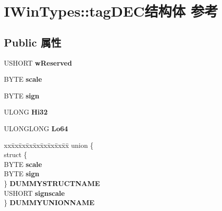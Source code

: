 \hypertarget{struct_i_win_types_1_1tag_d_e_c}{}\section{I\+Win\+Types\+:\+:tag\+D\+E\+C结构体 参考}
\label{struct_i_win_types_1_1tag_d_e_c}
\subsection*{Public 属性}
\begin{DoxyCompactItemize}
\item 
\mbox{\label{struct_i_win_types_1_1tag_d_e_c_a4f35a5f58c88f48495feab14fee2de23}} 
U\+S\+H\+O\+RT {\bfseries w\+Reserved}
\item 
\mbox{\label{struct_i_win_types_1_1tag_d_e_c_ac6809b46a7db896bdaa16b2de7d71191}} 
B\+Y\+TE {\bfseries scale}
\item 
\mbox{\label{struct_i_win_types_1_1tag_d_e_c_a2d4169972bcb2928fd4f04a11f12e040}} 
B\+Y\+TE {\bfseries sign}
\item 
\mbox{\label{struct_i_win_types_1_1tag_d_e_c_ae35ceb62a46623b7ba1fa150fa511af5}} 
U\+L\+O\+NG {\bfseries Hi32}
\item 
\mbox{\label{struct_i_win_types_1_1tag_d_e_c_a3f94f75f4a553477bc75f7919feeccfb}} 
U\+L\+O\+N\+G\+L\+O\+NG {\bfseries Lo64}
\item 
\mbox{\label{struct_i_win_types_1_1tag_d_e_c_a2cbb1b5956152a243499587b02b60cb3}} 
\begin{tabbing}
xx\=xx\=xx\=xx\=xx\=xx\=xx\=xx\=xx\=\kill
union \{\\
\>struct \{\\
\>\>BYTE {\bfseries scale}\\
\>\>BYTE {\bfseries sign}\\
\>\} {\bfseries DUMMYSTRUCTNAME}\\
\>USHORT {\bfseries signscale}\\
\} {\bfseries DUMMYUNIONNAME}\\


\end{tabbing}
\end{DoxyCompactItemize}
